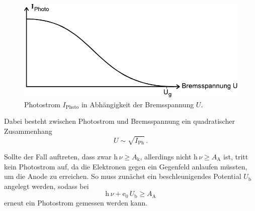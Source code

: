\begin{figure}[H]
    \centering
    \includegraphics{figures/Abb4.pdf}
    \caption{Photostrom $I_\text{Photo}$ in Abhängigkeit der Bremsspannung $U$.}
    \label{fig:abb4}
\end{figure}

Dabei besteht zwischen Photostrom und Bremsspannung ein quadratischer Zusammenhang
\begin{equation*}
    U \sim \sqrt{I_\text{Ph}} \,.
\end{equation*}

Sollte der Fall auftreten, dass zwar $\text{h} \, \nu \geq A_\text{k}$, allerdings nicht $\text{h} \, \nu \geq A_\text{A}$ ist, tritt kein Photostrom auf, da die Elektronen gegen ein Gegenfeld anlaufen müssten,
um die Anode zu erreichen.
So muss zunächst ein beschleunigendes Potential $U_\text{b}$ angelegt werden, sodass bei
\begin{equation*}
    \text{h} \, \nu + \text{e}_0 \, U_\text{b} \geq A_\text{A}
\end{equation*}
erneut ein Photostrom gemessen werden kann.

